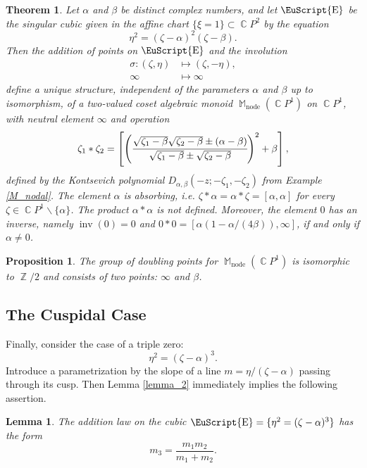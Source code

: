 \documentclass[14pt, dvipsnames]{extarticle}
\theoremstyle{plain}
\newtheorem{theorem}{Theorem}
\newtheorem{lemma}{Lemma}
\newtheorem{prop}{Proposition}
\theoremstyle{definition}
\theoremstyle{remark}
\DeclareMathOperator{\E}{\EuScript{E}}
\DeclareMathOperator{\inv}{\mathrm{inv}}
\DeclareMathOperator{\Z}{\mathbb{Z}}
\DeclareMathOperator{\Cc}{\mathbb{C}}
\DeclareMathOperator{\M}{\mathbb{M}}
\DeclareMathOperator{\node}{\mathrm{node}}
\begin{document}
\begin{theorem}\label{nodal_monoids}
Let $\alpha$ and $\beta$ be distinct complex numbers, and let $\E$ be the singular cubic given in the affine chart $\{\xi = 1\}\subset\Cc\!P^2$ by the equation
$$\eta^2 = (\zeta - \alpha)^2(\zeta - \beta).$$
Then the addition of points on $\E$ and the involution
\begin{equation}\label{the_involution_sigma}
\begin{aligned}
\sigma: (\zeta, \eta)&\mapsto (\zeta, -\eta),\\
\infty&\mapsto\infty
\end{aligned}
\end{equation}
define a unique structure, independent of the parameters $\alpha$ and $\beta$ up to isomorphism, of a two-valued coset algebraic monoid $\M_{\node}(\Cc\!P^1)$ on $\Cc\!P^1$, with neutral element $\infty$ and operation
$$\zeta_1\ast \zeta_2 = \left[ \left( \cfrac{\sqrt{\zeta_1-\beta}\sqrt{\zeta_2-\beta}\pm(\alpha-\beta)}{\sqrt{\zeta_1-\beta}\pm\sqrt{\zeta_2-\beta}} \right)^2+\beta\right],$$
defined by the {Kontsevich polynomial} $D_{\alpha, \beta}(-z; -\zeta_1,-\zeta_2)$ from Example {\normalfont\ref{M_nodal}}. The element $\alpha$ is absorbing, i.e. $\zeta\ast\alpha = \alpha\ast \zeta = [\alpha, \alpha]$ for every $\zeta\in\Cc\!P^1\backslash\{\alpha\}$. The product $\alpha\ast\alpha$ is not defined. Moreover, the element $0$ has an inverse, namely $\inv(0) = 0$ and $0\ast 0 = \left[\alpha(1-\alpha/(4\beta)), \infty\right]$, if and only if $\alpha\neq 0$.  
\end{theorem}

\begin{prop}
{The group of doubling points for $\M_{\node}(\Cc\!P^1)$ is isomorphic to $\Z/2$ and consists of two points: $\infty$ and $\beta$.}
\end{prop}

\subsection{The Cuspidal Case}

Finally, consider the case of a triple zero:
$$\eta^2 = (\zeta - \alpha)^3.$$
Introduce a parametrization by the slope of a line $m = \eta/(\zeta-\alpha)$ passing through its cusp. Then Lemma \ref{lemma_2} immediately implies the following assertion. 

\begin{lemma}
The addition law on the cubic $\E = \{\eta^2 = (\zeta - \alpha)^3\}$ has the form
\begin{equation}\label{cusp_law}
m_3 = \frac{m_1m_2}{m_1 + m_2}.
\end{equation}
\end{lemma}
\end{document}
